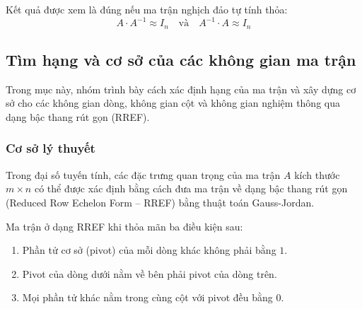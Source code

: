 \documentclass[12pt,a4paper]{article}
\begin{document}
\begin{infobox}
Kết quả được xem là đúng nếu ma trận nghịch đảo tự tính thỏa:
\begin{equation}
A \cdot A^{-1} \approx I_n \quad \text{và} \quad A^{-1} \cdot A \approx I_n
\end{equation}
\end{infobox}

\subsection{Tìm hạng và cơ sở của các không gian ma trận}
Trong mục này, nhóm trình bày cách xác định hạng của ma trận và xây dựng cơ sở cho các không gian dòng, không gian cột và không gian nghiệm thông qua dạng bậc thang rút gọn (RREF).

\subsubsection{Cơ sở lý thuyết}
Trong đại số tuyến tính, các đặc trưng quan trọng của ma trận $A$ kích thước $m \times n$ có thể được xác định bằng cách đưa ma trận về dạng bậc thang rút gọn (Reduced Row Echelon Form -- RREF) bằng thuật toán Gauss-Jordan.

\begin{infobox}
Ma trận ở dạng RREF khi thỏa mãn ba điều kiện sau:
\begin{enumerate}[label=\textbf{\arabic*)}, leftmargin=*, align=left]
    \item Phần tử cơ sở (pivot) của mỗi dòng khác không phải bằng $1$.
    \item Pivot của dòng dưới nằm về bên phải pivot của dòng trên.
    \item Mọi phần tử khác nằm trong cùng cột với pivot đều bằng $0$.
\end{enumerate}
\end{infobox}
\end{document}
